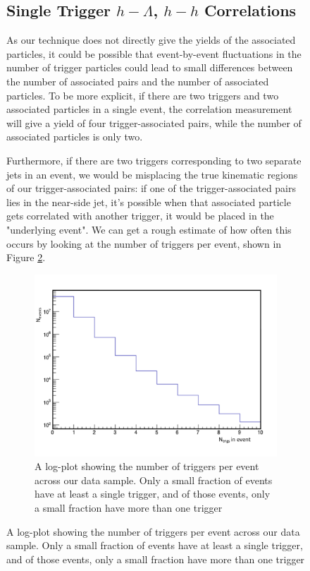 \documentclass[ALICE,manyauthors]{ALICE_analysis_notes}
\begin{document}
\begin{figure}[ht]
\subsection{Single Trigger $h-\Lambda$, $h-h$ Correlations}

As our technique does not directly give the yields of the associated particles, it could be possible that event-by-event fluctuations in the number of trigger particles could lead to small differences between the number of associated pairs and the number of associated particles. To be more explicit, if there are two triggers and two associated particles in a single event, the correlation measurement will give a yield of four trigger-associated pairs, while the number of associated particles is only two. 

Furthermore, if there are two triggers corresponding to two separate jets in an event, we would be misplacing the true kinematic regions of our trigger-associated pairs: if one of the trigger-associated pairs lies in the near-side jet, it's possible when that associated particle gets correlated with another trigger, it would be placed in the "underlying event". We can get a rough estimate of how often this occurs by looking at the number of triggers per event, shown in Figure \ref{trigs_per_event}.

\begin{figure}[ht]
\centering
\includegraphics[width=4in]{figures/trig_per_event.pdf}
\caption{A log-plot showing the number of triggers per event across our data sample. Only a small fraction of events have at least a single trigger, and of those events, only a small fraction have more than one trigger}
\label{trigs_per_event}
\end{figure}


\end{figure}
\end{document}
